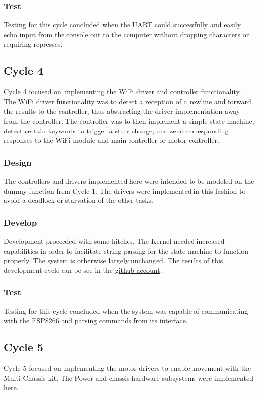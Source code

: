 \documentclass{article}
\begin{document}
\subsubsection*{Test}
Testing for this cycle concluded when the UART could successfully and easily echo input from the console out to the computer without dropping characters or requiring represses.

\subsection*{Cycle 4}

Cycle 4 focused on implementing the WiFi driver and controller functionality.  The WiFi driver functionality was to detect a reception of a newline and forward the results to the controller, thus abstracting the driver implementation away from the controller.  The controller was to then implement a simple state machine, detect certain keywords to trigger a state change, and send corresponding responses to the WiFi module and main controller or motor controller.

\subsubsection*{Design}
The controllers and drivers implemented here were intended to be modeled on the dummy function from Cycle 1.  The drivers were implemented in this fashion to avoid a deadlock or starvation of the other tasks.

\subsubsection*{Develop}
Development proceeded with some hitches.  The Kernel needed increased capabilities in order to facilitate string parsing for the state machine to function properly.  The system is otherwise largely unchanged.  The results of this development cycle can be see in the \href{https://github.com/Shamshel/ECE5770/commit/b789e506165f0ada4f6a83999845b9865b585fe4}{github account}.

\subsubsection*{Test}
Testing for this cycle concluded when the system was capable of communicating with the ESP8266 and parsing commands from its interface.

\subsection*{Cycle 5}
Cycle 5 focused on implementing the motor drivers to enable movement with the Multi-Chassis kit\cite{multi-chassis}.  The Power and chassis hardware subsystems were implemented here.
\end{document}
